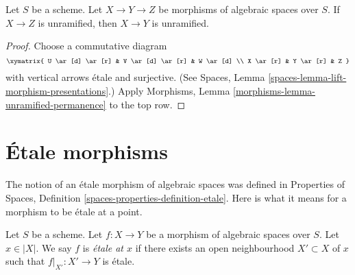 \begin{lemma}
\label{lemma-permanence-unramified}
Let $S$ be a scheme.
Let $X \to Y \to Z$ be morphisms of algebraic spaces over $S$.
If $X \to Z$ is unramified, then $X \to Y$ is unramified.
\end{lemma}

\begin{proof}
Choose a commutative diagram
$$
\xymatrix{
U \ar[d] \ar[r] & V \ar[d] \ar[r] & W \ar[d] \\
X \ar[r] & Y \ar[r] & Z
}
$$
with vertical arrows \'etale and surjective. (See
Spaces, Lemma \ref{spaces-lemma-lift-morphism-presentations}.)
Apply
Morphisms, Lemma \ref{morphisms-lemma-unramified-permanence}
to the top row.
\end{proof}














\section{\'Etale morphisms}
\label{section-etale}

\noindent
The notion of an \'etale morphism of algebraic spaces was defined in
Properties of Spaces, Definition \ref{spaces-properties-definition-etale}.
Here is what it means for a morphism to be \'etale at a point.

\begin{definition}
\label{definition-etale}
Let $S$ be a scheme.
Let $f : X \to Y$ be a morphism of algebraic spaces over $S$.
Let $x \in |X|$. We say $f$ is {\it \'etale at $x$} if there
exists an open neighbourhood $X' \subset X$ of $x$ such that
$f|_{X'} : X' \to Y$ is \'etale.
\end{definition}

